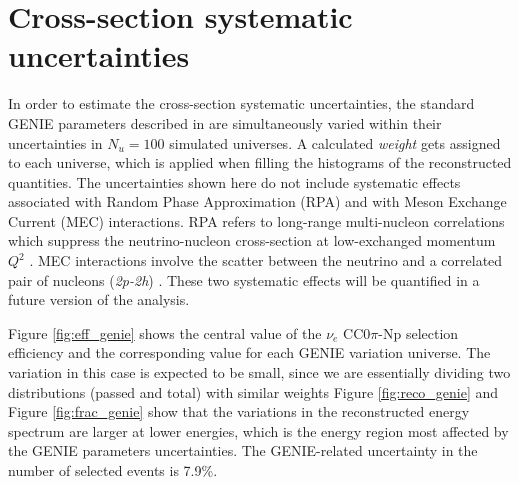 \section{Cross-section systematic uncertainties}
In order to estimate the cross-section systematic uncertainties, the standard GENIE parameters described in \cite{Andreopoulos:2009rq} are simultaneously varied within their uncertainties in $N_{u} = 100$ simulated universes. A calculated \emph{weight} gets assigned to each universe, which is applied when filling the histograms of the reconstructed quantities. The uncertainties shown here do not include systematic effects associated with Random Phase Approximation (RPA) and with Meson Exchange Current (MEC) interactions. RPA refers to long-range multi-nucleon correlations which suppress the neutrino-nucleon cross-section at low-exchanged momentum $Q^2$ \cite{Nieves:2011pp}. MEC interactions involve the scatter between the neutrino and a correlated pair of nucleons (\emph{2p-2h}) \cite{Bodek:2011ps}. These two systematic effects will be quantified in a future version of the analysis.

Figure \ref{fig:eff_genie} shows the central value of the $\nu_{e}$ CC0$\pi$-Np selection efficiency and the corresponding value for each GENIE variation universe. The variation in this case is expected to be small, since we are essentially dividing two distributions (passed and total) with similar weights Figure \ref{fig:reco_genie} and Figure \ref{fig:frac_genie} show that the variations in the reconstructed energy spectrum are larger at lower energies, which is the energy region most affected by the GENIE parameters uncertainties. The GENIE-related uncertainty in the number of selected events is 7.9\%.

